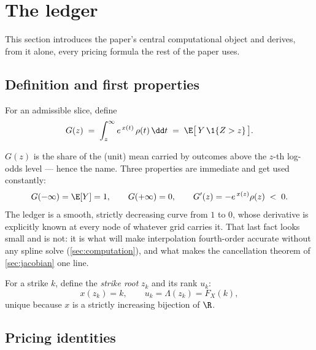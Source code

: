 \section{The ledger}
\label{sec:ledger}

This section introduces the paper's central computational object and
derives, from it alone, every pricing formula the rest of the paper uses.

\subsection{Definition and first properties}

\begin{definition}
\label{def:ledger}
For an admissible slice, define
\begin{equation}
G(z)\;=\;\int_{z}^{\infty}e^{\,x(t)}\,\rho(t)\,\dd t
\;=\;\E\big[\,Y\,\1\{Z>z\}\,\big] .
\label{eq:ledger}
\end{equation}
\end{definition}

$G(z)$ is the share of the (unit) mean carried by outcomes above the
$z$-th log-odds level --- hence the name.  Three properties are immediate
and get used constantly:
\begin{equation}
G(-\infty)=\E[Y]=1,
\qquad
G(+\infty)=0,
\qquad
G'(z)=-e^{\,x(z)}\rho(z)\;<\;0 .
\label{eq:ledgerprops}
\end{equation}
The ledger is a smooth, strictly decreasing curve from $1$ to $0$, whose
derivative is explicitly known at every node of whatever grid carries it.
That last fact looks small and is not: it is what will make interpolation
fourth-order accurate without any spline solve
(\cref{sec:computation}), and what makes the cancellation theorem of
\cref{sec:jacobian} one line.

For a strike $k$, define the \emph{strike root} $z_k$ and its rank $u_k$:
\begin{equation}
x(z_k)=k,
\qquad
u_k=\Lambda(z_k)=F_X(k) ,
\label{eq:strikeroot}
\end{equation}
unique because $x$ is a strictly increasing bijection of $\R$.

\subsection{Pricing identities}


